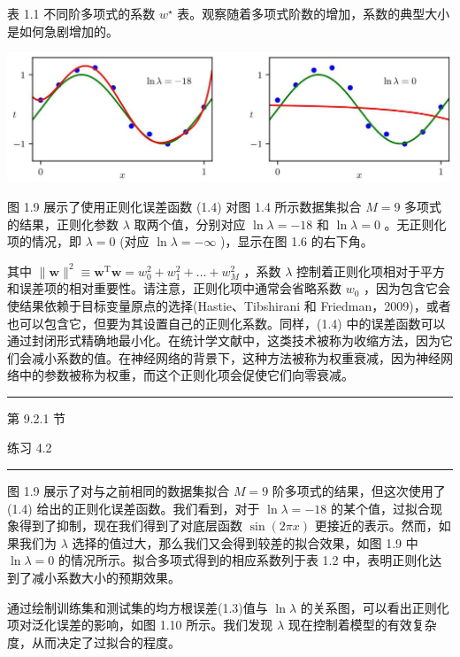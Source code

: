 \documentclass[10pt]{article}
\newcommand{\HRule}{\begin{center}\rule{0.9\linewidth}{0.2mm}\end{center}}
\begin{document}
表 1.1 不同阶多项式的系数 \({w}^{ \star  }\) 表。观察随着多项式阶数的增加，系数的典型大小是如何急剧增加的。

\begin{center}
\includegraphics[max width=1.0\textwidth]{images/0194e279-9b28-703a-88f4-c3ac21e2010d_32_240_344_1308_380_0.jpg}
\end{center}
\hspace*{3em} 

图 1.9 展示了使用正则化误差函数 (1.4) 对图 1.4 所示数据集拟合 \(M = 9\) 多项式的结果，正则化参数 \(\lambda\) 取两个值，分别对应 \(\ln \lambda  =  - {18}\) 和 \(\ln \lambda  = 0\) 。无正则化项的情况，即 \(\lambda  = 0\) (对应 \(\ln \lambda  =  - \infty\) )，显示在图 1.6 的右下角。

其中 \(\parallel \mathbf{w}{\parallel }^{2} \equiv  {\mathbf{w}}^{\mathrm{T}}\mathbf{w} = {w}_{0}^{2} + {w}_{1}^{2} + \ldots  + {w}_{M}^{2}\) ，系数 \(\lambda\) 控制着正则化项相对于平方和误差项的相对重要性。请注意，正则化项中通常会省略系数 \({w}_{0}\) ，因为包含它会使结果依赖于目标变量原点的选择(Hastie、Tibshirani 和 Friedman，2009)，或者也可以包含它，但要为其设置自己的正则化系数。同样，(1.4) 中的误差函数可以通过封闭形式精确地最小化。在统计学文献中，这类技术被称为收缩方法，因为它们会减小系数的值。在神经网络的背景下，这种方法被称为权重衰减，因为神经网络中的参数被称为权重，而这个正则化项会促使它们向零衰减。

\HRule

第 9.2.1 节

练习 4.2

\HRule

图 1.9 展示了对与之前相同的数据集拟合 \(M = 9\) 阶多项式的结果，但这次使用了 (1.4) 给出的正则化误差函数。我们看到，对于 \(\ln \lambda  =  - {18}\) 的某个值，过拟合现象得到了抑制，现在我们得到了对底层函数 \(\sin \left( {2\pi x}\right)\) 更接近的表示。然而，如果我们为 \(\lambda\) 选择的值过大，那么我们又会得到较差的拟合效果，如图 1.9 中 \(\ln \lambda  = 0\) 的情况所示。拟合多项式得到的相应系数列于表 1.2 中，表明正则化达到了减小系数大小的预期效果。

通过绘制训练集和测试集的均方根误差(1.3)值与 \(\ln \lambda\) 的关系图，可以看出正则化项对泛化误差的影响，如图 1.10 所示。我们发现 \(\lambda\) 现在控制着模型的有效复杂度，从而决定了过拟合的程度。
\end{document}
